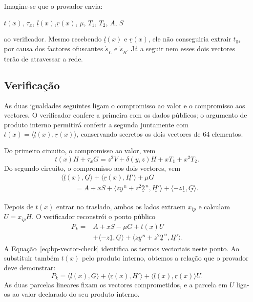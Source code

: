 Imagine-se que o provador envia:

$t(x)$, $\tau_x$, $\underline{l}(x)$,$\underline{r}(x)$, $\mu$, $T_1$, $T_2$, $A$, $S$

ao verificador. Mesmo recebendo \(\underline l(x)\) e \(\underline r(x)\), ele
não conseguiria extrair \(t_0\), por causa dos factores ofuscantes
\(\underline{\dot s}_L\) e \(\underline{\dot s}_R\). Já a seguir nem esses
dois vectores terão de atravessar a rede.

\subsection{Verificação}
\label{sec:bullet_ver}

As duas igualdades seguintes ligam o compromisso ao valor e o compromisso
aos vectores. O verificador confere a primeira com os dados públicos; o
argumento de produto interno permitirá conferir a segunda juntamente
com \(t(x)=\langle\underline l(x),\underline r(x)\rangle\), conservando
secretos os dois vectores de 64 elementos.

Do primeiro circuito, o compromisso ao valor, vem
\begin{equation}
t(x)H+\tau_xG
=z^2V+\delta(y,z)H+xT_1+x^2T_2.
\label{eq:bp-value-check}
\end{equation}
Do segundo circuito, o compromisso aos dois vectores, vem
\begin{equation}
\begin{split}
&\langle\underline l(x),\underline G\rangle+
 \langle\underline r(x),\underline{H'}\rangle+\mu G\\
&\qquad=A+xS+
 \langle z\underline y^{\,n}+z^2\underline2^{\,n},\underline{H'}\rangle+
 \langle-z\underline1,\underline G\rangle.
\end{split}
\label{eq:bp-vector-check}
\end{equation}

Depois de \(t(x)\) entrar no traslado, ambos os lados extraem \(x_{ip}\) e
calculam \(U=x_{ip}H\). O verificador reconstrói o ponto público
\begin{equation}
\begin{split}
 P_k={}&A+xS-\mu G+t(x)U\\
 &+\langle-z\underline1,\underline G\rangle
 +\langle z\underline y^{\,n}+z^2\underline2^{\,n},
                                      \underline{H'}\rangle.
\end{split}
\label{eq:bp-public-ip-point}
\end{equation}
A Equação~\eqref{eq:bp-vector-check} identifica os termos vectoriais
neste ponto. Ao substituir também \(t(x)\) pelo produto interno,
obtemos a relação que o provador deve demonstrar:
\[
 P_k=\langle\underline l(x),\underline G\rangle+
     \langle\underline r(x),\underline{H'}\rangle+
     \langle\underline l(x),\underline r(x)\rangle U.
\]
As duas parcelas lineares fixam os vectores comprometidos, e a parcela
em \(U\) liga-os ao valor declarado do seu produto interno.

